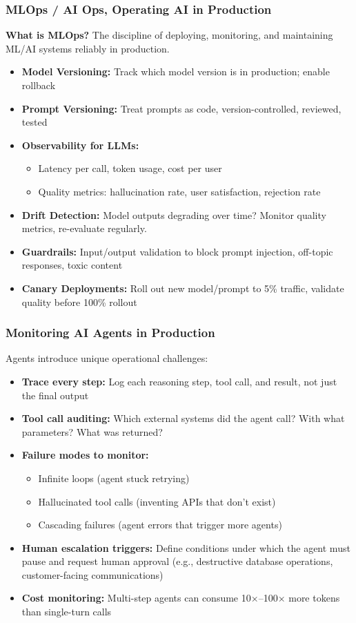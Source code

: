 \begin{frame}[fragile]\frametitle{MLOps / AI Ops, Operating AI in Production}
\textbf{What is MLOps?} The discipline of deploying, monitoring, and maintaining ML/AI systems reliably in production.

\begin{itemize}
\item \textbf{Model Versioning:} Track which model version is in production; enable rollback
\item \textbf{Prompt Versioning:} Treat prompts as code, version-controlled, reviewed, tested
\item \textbf{Observability for LLMs:}
  \begin{itemize}
  \item Latency per call, token usage, cost per user
  \item Quality metrics: hallucination rate, user satisfaction, rejection rate
  \end{itemize}
\item \textbf{Drift Detection:} Model outputs degrading over time? Monitor quality metrics, re-evaluate regularly.
\item \textbf{Guardrails:} Input/output validation to block prompt injection, off-topic responses, toxic content
\item \textbf{Canary Deployments:} Roll out new model/prompt to 5\% traffic, validate quality before 100\% rollout
\end{itemize}
\end{frame}

\begin{frame}[fragile]\frametitle{Monitoring AI Agents in Production}
Agents introduce unique operational challenges:
\begin{itemize}
\item \textbf{Trace every step:} Log each reasoning step, tool call, and result, not just the final output
\item \textbf{Tool call auditing:} Which external systems did the agent call? With what parameters? What was returned?
\item \textbf{Failure modes to monitor:}
  \begin{itemize}
  \item Infinite loops (agent stuck retrying)
  \item Hallucinated tool calls (inventing APIs that don't exist)
  \item Cascading failures (agent errors that trigger more agents)
  \end{itemize}
\item \textbf{Human escalation triggers:} Define conditions under which the agent must pause and request human approval (e.g., destructive database operations, customer-facing communications)
\item \textbf{Cost monitoring:} Multi-step agents can consume 10$\times$--100$\times$ more tokens than single-turn calls
\end{itemize}
\end{frame}


